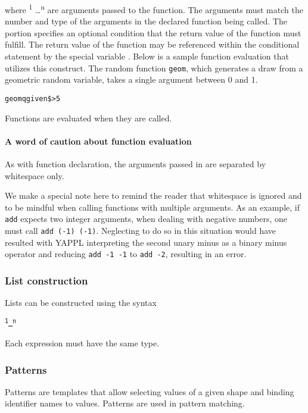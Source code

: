 where  \textsuperscript{1} \dots {}\textsuperscript{n} are arguments passed to the function. The arguments must match the number and type of the arguments in the declared function being called. The   portion specifies an optional condition that the return value of the function must fulfill. The return value of the function may be referenced within the conditional statement by the special variable \term{\$}. Below is a sample function evaluation that utilizes this construct. The random function \texttt{geom}, which generates a draw from a geometric random variable, takes a single argument between 0 and 1.

\begin{alltt}
\quad \midtilde geom q given \$ > 5
\end{alltt}

Functions are evaluated when they are called. 

\paragraph{A word of caution about function evaluation}

As with function declaration, the arguments passed in are separated by whitespace only.

We make a special note here to remind the reader that whitespace is ignored and to be mindful when calling functions with multiple arguments. As an example, if \texttt{add} expects two integer arguments, when dealing with negative numbers, one must call \texttt{\midtilde add (-1) (-1)}. Neglecting to do so in this situation would have resulted with YAPPL interpreting the second unary minus as a binary minus operator and reducing \texttt{\midtilde add -1 -1} to \texttt{\midtilde add -2}, resulting in an error.

\subsubsection{List construction}

Lists can be constructed using the syntax
\begin{alltt}
\quad \term{[} \textsuperscript{1} \term{,} \dots \term{,} \textsuperscript{n}  \term{]}
\end{alltt}
Each expression must have the same type. 

\subsubsection{Patterns} 
Patterns are templates that allow selecting values of a given shape and binding identifier names to values. Patterns are used in pattern matching. 

